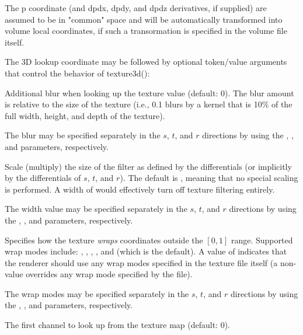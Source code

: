\documentclass[11pt,letterpaper]{book}
\def\commonspace{{\cf "common"} space\xspace}
\begin{document}
The {\cf p} coordinate (and {\cf dpdx}, {\cf dpdy}, and {\cf dpdz}
derivatives, if supplied) are assumed to be in \commonspace and will be
automatically transformed into volume local coordinates, if such a
transormation is specified in the volume file itself.

The 3D lookup coordinate may be followed by optional token/value
arguments that control the behavior of {\cf texture3d()}:

\vspace{12pt}
Additional blur when looking up the texture value (default: 0).  The
blur amount is relative to the size of the texture (i.e., 0.1 blurs by a
kernel that is 10\% of the full width, height, and depth of the texture).

The blur may be specified separately in the $s$, $t$, and $r$ directions by
using the , , and  parameters, respectively.
\apiend
\vspace{-16pt}

\vspace{12pt}
Scale (multiply) the size of the filter as defined by the differentials
(or implicitly by the differentials of $s$, $t$, and $r$).  The default is
{}, meaning that no special scaling is performed.  A width of
{} would effectively turn off texture filtering entirely.

The width value may be specified separately in the $s$, $t$, and $r$
directions by using the , , and  parameters,
respectively.
\apiend
\vspace{-16pt}

\vspace{12pt}

Specifies how the texture \emph{wraps} coordinates outside the $[0,1]$
range.  Supported wrap modes include: , ,
, , and  (which is the default).  A
value of  indicates that the renderer should use any wrap
modes specified in the texture file itself (a non- value
overrides any wrap mode specified by the file).

The wrap modes may be specified separately in the $s$, $t$, and $r$
directions by using the , , and 
parameters, respectively.
\apiend
\vspace{-16pt}

\vspace{12pt}
The first channel to look up from the texture map (default: 0).
\apiend
\vspace{-16pt}
\end{document}
